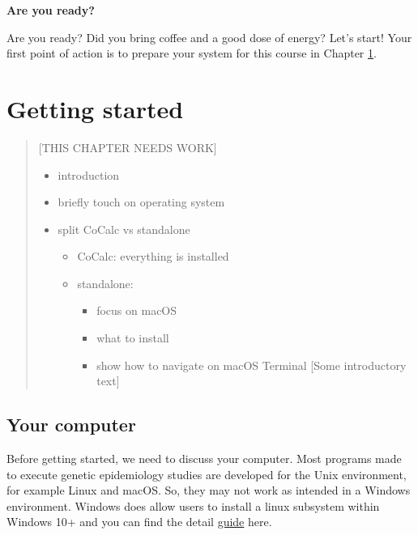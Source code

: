 \documentclass[
]{book}
\providecommand{\tightlist}{%
  \setlength{\itemsep}{0pt}\setlength{\parskip}{0pt}}
\begin{document}
\textbf{Are you ready?}

Are you ready? Did you bring coffee and a good dose of energy? Let's start! Your first point of action is to prepare your system for this course in Chapter \ref{getting-started}.

\hypertarget{getting-started}{%
\chapter{Getting started}\label{getting-started}}

\begin{quote}
{[}THIS CHAPTER NEEDS WORK{]}

\begin{itemize}
\tightlist
\item
  introduction
\item
  briefly touch on operating system
\item
  split CoCalc vs standalone

  \begin{itemize}
  \tightlist
  \item
    CoCalc: everything is installed
  \item
    standalone:

    \begin{itemize}
    \tightlist
    \item
      focus on macOS
    \item
      what to install
    \item
      show how to navigate on macOS Terminal
      {[}Some introductory text{]}
    \end{itemize}
  \end{itemize}
\end{itemize}
\end{quote}

\hypertarget{your-computer}{%
\section{Your computer}\label{your-computer}}

Before getting started, we need to discuss your computer. Most programs made to execute genetic epidemiology studies are developed for the Unix environment, for example Linux and macOS. So, they may not work as intended in a Windows environment. Windows does allow users to install a linux subsystem within Windows 10+ and you can find the detail \href{https://docs.microsoft.com/en-us/windows/wsl/about}{guide} here.
\end{document}
